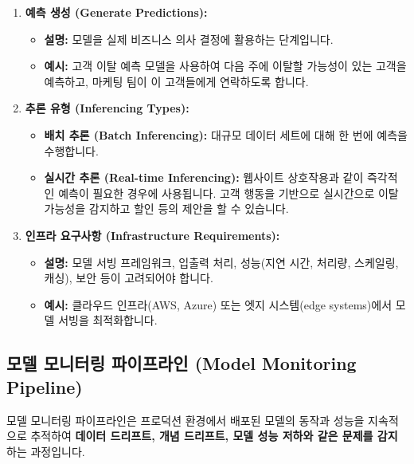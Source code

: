 \documentclass[11pt,a4paper]{article}
\theoremstyle{definition}
\begin{document}
\begin{enumerate}
    \item \textbf{예측 생성 (Generate Predictions):}
    \begin{itemize}
        \item \textbf{설명:} 모델을 실제 비즈니스 의사 결정에 활용하는 단계입니다.
        \item \textbf{예시:} 고객 이탈 예측 모델을 사용하여 다음 주에 이탈할 가능성이 있는 고객을 예측하고, 마케팅 팀이 이 고객들에게 연락하도록 합니다.
    \end{itemize}

    \item \textbf{추론 유형 (Inferencing Types):}
    \begin{itemize}
        \item \textbf{배치 추론 (Batch Inferencing):} 대규모 데이터 세트에 대해 한 번에 예측을 수행합니다.
        \item \textbf{실시간 추론 (Real-time Inferencing):} 웹사이트 상호작용과 같이 즉각적인 예측이 필요한 경우에 사용됩니다. 고객 행동을 기반으로 실시간으로 이탈 가능성을 감지하고 할인 등의 제안을 할 수 있습니다.
    \end{itemize}

    \item \textbf{인프라 요구사항 (Infrastructure Requirements):}
    \begin{itemize}
        \item \textbf{설명:} 모델 서빙 프레임워크, 입출력 처리, 성능(지연 시간, 처리량, 스케일링, 캐싱), 보안 등이 고려되어야 합니다.
        \item \textbf{예시:} 클라우드 인프라(AWS, Azure) 또는 엣지 시스템(edge systems)에서 모델 서빙을 최적화합니다.
    \end{itemize}
\end{enumerate}

\subsection{모델 모니터링 파이프라인 (Model Monitoring Pipeline)}

\begin{summarybox}
모델 모니터링 파이프라인은 프로덕션 환경에서 배포된 모델의 동작과 성능을 지속적으로 추적하여 \textbf{데이터 드리프트, 개념 드리프트, 모델 성능 저하와 같은 문제를 감지}하는 과정입니다.
\end{summarybox}
\end{document}
